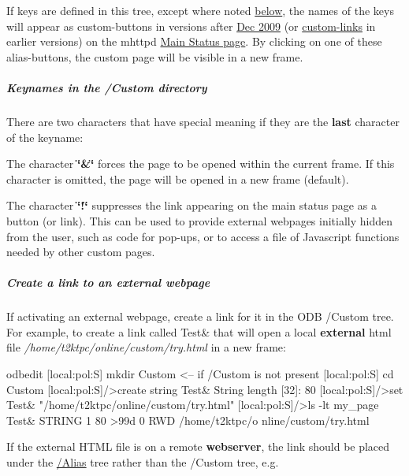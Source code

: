 If keys are defined in this tree, except where noted \hyperlink{RC_mhttpd_Activate_RC_odb_custom_keynames}{below}, the names of the keys will appear as custom-\/buttons in versions after \hyperlink{NDF_ndf_dec_2009}{Dec 2009} (or \hyperlink{RC_mhttpd_Alias_page}{custom-\/links} in earlier versions) on the  mhttpd \hyperlink{RC_mhttpd_Main_Status_page_RC_mhttpd_main_status}{Main Status page}. By clicking on one of these alias-\/buttons, the custom page will be visible in a new frame. \par
\hypertarget{RC_mhttpd_Activate_RC_odb_custom_keynames}{}\subparagraph{Keynames in the /Custom directory}\label{RC_mhttpd_Activate_RC_odb_custom_keynames}
There are two characters that have special meaning if they are the {\bfseries last} character of the keyname:
\begin{DoxyItemize}
\item The character {\bfseries \char`\"{}\&\char`\"{}} forces the page to be opened within the current frame. If this character is omitted, the page will be opened in a new frame (default).
\end{DoxyItemize}


\begin{DoxyItemize}
\item The character {\bfseries \char`\"{}!\char`\"{}} suppresses the link appearing on the main status page as a button (or link). This can be used to provide external webpages initially hidden from the user, such as code for pop-\/ups, or to access a file of Javascript functions needed by other custom pages.
\end{DoxyItemize}\hypertarget{RC_mhttpd_Activate_RC_odb_custom_external_example}{}\subparagraph{Create a link to an external webpage}\label{RC_mhttpd_Activate_RC_odb_custom_external_example}
If activating an external webpage, create a link for it in the ODB /Custom tree. For example, to create a link called Test\& that will open a  local  {\bfseries external} html file {\itshape  /home/t2ktpc/online/custom/try.html \/} in a new frame: 
\begin{DoxyCode}
odbedit
[local:pol:S] mkdir Custom   <-- if /Custom is not present
[local:pol:S] cd Custom
[local:pol:S]/>create string Test&
String length [32]: 80
[local:pol:S]/>set Test& "/home/t2ktpc/online/custom/try.html"
[local:pol:S]/>ls -lt my_page
Test&                            STRING  1     80    >99d 0   RWD  /home/t2ktpc/o
      nline/custom/try.html
\end{DoxyCode}
 \par
 \label{RC_mhttpd_Activate_remote}
\hypertarget{RC_mhttpd_Activate_remote}{}
 If the external HTML file is on a  remote  {\bfseries webserver}, the link should be placed under the \hyperlink{RC_mhttpd_Alias_page_RC_odb_alias_tree}{/Alias} tree rather than the /Custom tree, e.g.


